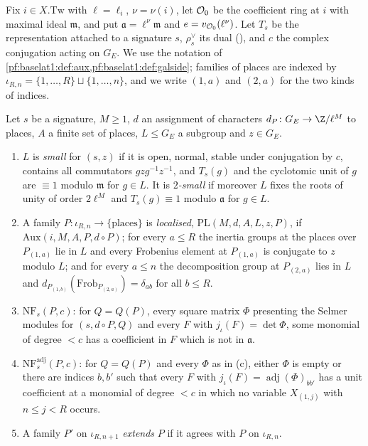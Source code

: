 Fix $i\in X.\mathrm{Tw}$ with $\ell=\ell_i$, $\nu=\nu(i)$, let $\mathcal O_0$ be the coefficient ring at $i$ with maximal
ideal $\mathfrak m$, and put $\mathfrak a=\ell^{\nu}\mathfrak m$ and $e=v_{\mathcal O_0}(\ell^\nu)$. Let $T_s$ be the
representation attached to a signature $s$, $\rho^\vee_s$ its dual (), and
$c$ the complex conjugation acting on $G_E$. We use the notation of \cref{pf:baselat1:def:aux,pf:baselat1:def:galside};
families of places are indexed by $\iota_{R,n}=\{1,\dots,R\}\sqcup\{1,\dots,n\}$, and we write $(1,a)$ and $(2,a)$ for the
two kinds of indices.

\begin{definition}\label{pf:baselat1:def:induction}
Let $s$ be a signature, $M\ge1$, $d$ an assignment of characters $d_P\colon G_E\to\Z/\ell^M$ to places, $A$ a finite set of
places, $L\le G_E$ a subgroup and $z\in G_E$.
\begin{enumerate}[label=(\alph*)]
\item $L$ is \emph{small} for $(s,z)$ if it is open, normal, stable under conjugation by $c$, contains all commutators
  $gzg^{-1}z^{-1}$, and $T_s(g)$ and the cyclotomic unit of $g$ are $\equiv1$ modulo $\mathfrak m$ for $g\in L$. It is
  \emph{$2$-small} if moreover $L$ fixes the roots of unity of order $2\ell^M$ and $T_s(g)\equiv1$ modulo $\mathfrak a$ for
  $g\in L$.
\item A family $P\colon\iota_{R,n}\to\{\text{places}\}$ is \emph{localised}, $\mathrm{PL}(M,d,A,L,z,P)$, if
  $\mathrm{Aux}(i,M,A,P,d\circ P)$; for every $a\le R$ the inertia groups at the places over $P_{(1,a)}$ lie in $L$ and every
  Frobenius element at $P_{(1,a)}$ is conjugate to $z$ modulo $L$; and for every $a\le n$ the decomposition group at
  $P_{(2,a)}$ lies in $L$ and $d_{P_{(1,b)}}(\mathrm{Frob}_{P_{(2,a)}})=\delta_{ab}$ for all $b\le R$.
\item $\mathrm{NF}_s(P,c)$: for $Q=Q(P)$, every square matrix $\Phi$ presenting the Selmer modules for $(s,d\circ P,Q)$ and
  every $F$ with $j_\iota(F)=\det\Phi$, some monomial of degree $<c$ has a coefficient in $F$ which is not in $\mathfrak a$.
\item $\mathrm{NF}^{\mathrm{adj}}_s(P,c)$: for $Q=Q(P)$ and every $\Phi$ as in (c), either $\Phi$ is empty or there are indices $b,b'$
  such that every $F$ with $j_\iota(F)=\operatorname{adj}(\Phi)_{bb'}$ has a unit coefficient at a monomial of degree $<c$
  in which no variable $X_{(1,j)}$ with $n\le j<R$ occurs.
\item A family $P'$ on $\iota_{R,n+1}$ \emph{extends} $P$ if it agrees with $P$ on $\iota_{R,n}$.

\end{enumerate}
\end{definition}
